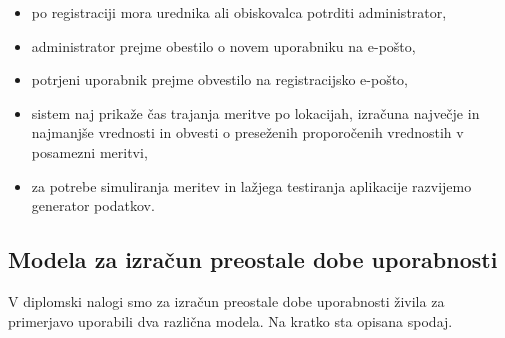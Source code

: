 \documentclass[a4paper, 12pt]{book}
\begin{document}
\begin{itemize}
\item po registraciji mora urednika ali obiskovalca potrditi administrator,

\item administrator prejme obestilo o novem uporabniku na e-pošto,

\item potrjeni uporabnik prejme obvestilo na registracijsko e-pošto,

\item sistem naj prikaže čas trajanja meritve po lokacijah, izračuna največje in najmanjše vrednosti in obvesti o preseženih proporočenih vrednostih v posamezni meritvi,

\item za potrebe simuliranja meritev in lažjega testiranja aplikacije razvijemo generator podatkov.

\end{itemize}


\subsection{Modela za izračun preostale dobe uporabnosti}
\label{modela-za-izracun-sl}

V diplomski nalogi smo za izračun preostale dobe uporabnosti živila za primerjavo uporabili dva različna modela. Na kratko sta opisana spodaj.
\end{document}
